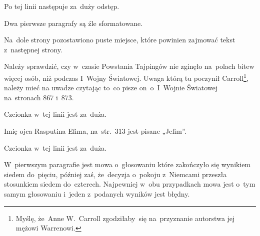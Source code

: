 \documentclass[a4paper,11pt]{article}
\begin{document}
\vspace{\spaceFour}



\start {} Po tej linii następuje za~duży odstęp.

\vspace{\spaceFour}



\start {} Dwa pierwsze paragrafy są źle sformatowane.

\vspace{\spaceFour}



\start {} Na~dole strony pozostawiono puste miejsce, które
powinien zajmować tekst z~następnej strony.

\vspace{\spaceFour}



\start {} Należy sprawdzić, czy w~czasie Powstania Tajpingów
nie zginęło na~polach bitew więcej osób, niż podczas I~Wojny
Światowej. Uwaga którą tu poczynił Carroll\footnote{Myślę, że~Anne
  W.~Carroll zgodziłaby~się na~przyznanie autorstwa jej mężowi
  Warrenowi.}, należy mieć na uwadze czytając to~co pisze
on~o~I~Wojnie Światowej na~stronach 867 i~873.

\vspace{\spaceFour}



\start {} Czcionka w~tej linii jest za~duża.

\vspace{\spaceFour}



\start {} Imię ojca Rasputina Efima, na~str.~313 jest
pisane „Jefim”.

\vspace{\spaceFour}



\start {} Czcionka w~tej linii jest za~duża.

\vspace{\spaceFour}



\start {} W~pierwszym paragrafie jest mowa o~głosowaniu które
zakończyło się wynikiem siedem do~pięciu, później zaś, że~decyzja
o~pokoju z~Niemcami przeszła stosunkiem siedem do~czterech. Najpewniej
w~obu przypadkach mowa jest o~tym samym głosowaniu i~jeden z~podanych
wyników jest błędny.

\vspace{\spaceFour}
\end{document}
